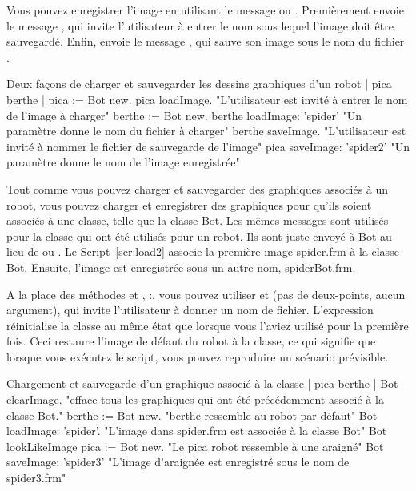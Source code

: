\documentclass[a4paper,10pt,twoside]{book}
\begin{document}
Vous pouvez enregistrer l'image en utilisant le message  ou . Premi\`erement 
 envoie le message , qui invite l'utilisateur \`a entrer le nom sous 
lequel l'image doit \^etre sauvegard\'e. Enfin,  envoie le message , 
qui sauve son image sous le nom du fichier . 




\begin{script}[load1]{Deux façons de charger et sauvegarder les dessins graphiques d'un robot}
	| pica berthe | 
	pica := Bot new. 
	pica loadImage.             "L'utilisateur est invit\'e \`a entrer le nom de l'image \`a charger" 
	berthe := Bot new. 
	berthe loadImage: 'spider'   "Un param\`etre donne le nom du fichier \`a charger" 
	berthe saveImage.           "L'utilisateur est invit\'e \`a nommer le fichier de sauvegarde de l'image" 
	pica saveImage: 'spider2'   "Un param\`etre donne le nom de l'image enregistr\'ee" 
\end{script}

Tout comme vous pouvez charger et sauvegarder des graphiques associ\'es \`a un robot, 
vous pouvez charger et enregistrer des graphiques pour qu'ils soient associ\'es \`a une classe, 
telle que la classe Bot. Les m\^emes messages sont utilis\'es pour la classe qui ont \'et\'e utilis\'es 
pour un robot. Ils sont juste envoy\'e \`a Bot au lieu de ou . Le Script~\ref{scr:load2} associe la premi\`ere image spider.frm \`a la classe Bot. 
Ensuite, l'image est enregistr\'ee sous un autre nom, spiderBot.frm. 

A la place des m\'ethodes   et , :, vous pouvez utiliser  et  
(pas de deux-points, aucun argument), qui invite l'utilisateur \`a donner un nom de fichier. 
L'expression  r\'einitialise la classe  au m\^eme \'etat que lorsque vous l'aviez utilis\'e pour 
la premi\`ere fois. Ceci restaure l'image de d\'efaut du robot \`a la classe, ce qui signifie que 
lorsque vous ex\'ecutez le script, vous pouvez reproduire un sc\'enario pr\'evisible.

\begin{script}[load2]{Chargement et sauvegarde d'un graphique associ\'e \`a la classe }
| pica berthe | 
Bot clearImage.           "efface tous les graphiques qui ont \'et\'e pr\'ec\'edemment associ\'e \`a la classe Bot." 
berthe := Bot new.        "berthe ressemble au robot par d\'efaut" 
Bot loadImage: 'spider'.  "L'image dans spider.frm est associ\'ee \`a la classe Bot" 
Bot lookLikeImage 
pica := Bot new.          "Le pica robot ressemble \`a une araign\'e" 
Bot saveImage: 'spider3'  "L'image d'araign\'ee est enregistr\'e sous le nom de spider3.frm" 
\end{script}
\end{document}
